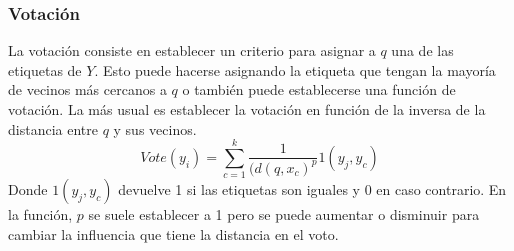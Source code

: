 \subsubsection{Votación}
La votación consiste en establecer un criterio para asignar a $q$ una de las etiquetas de $Y$. Esto puede hacerse asignando la etiqueta que tengan la mayoría de vecinos más cercanos a $q$ o también puede establecerse una función de votación. La más usual es establecer la votación en función de la inversa de la distancia entre $q$ y sus vecinos. 
\[ Vote(y_{i}) = \sum^{k}_{c=1} \frac{1}{(d(q,x_{c})^{p}} 1(y_{j},y_{c}) \]
Donde $1(y_{j},y_{c})$ devuelve 1 si las etiquetas son iguales y 0 en caso contrario. En la función, $p$ se suele establecer a 1 pero se puede aumentar o disminuir para cambiar la influencia que tiene la distancia en el voto. \cite{padraiddelany2007k}

